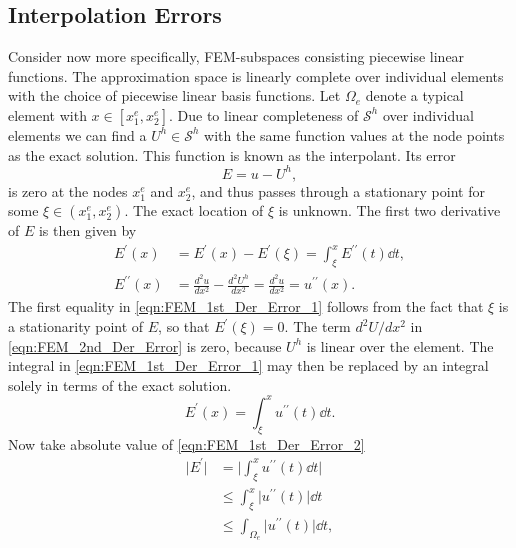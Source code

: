 \subsection{Interpolation Errors}	\label{cha:Interpolation_Errors}
Consider now more specifically, FEM-subspaces consisting piecewise linear functions. The approximation space is linearly complete
over individual elements with the choice of piecewise linear basis functions. Let $\Omega_e$ denote a typical element with
$x \in \left[ x_1^e, x_2^e \right]$. Due to linear completeness of $\mathcal{S}^h$ over individual elements we can find a
$U^h \in \mathcal{S}^h$ with the same function values at the node points as the exact solution. This function is known as the interpolant.
Its error
\begin{equation}	\label{eqn:FEM_Error_1}
	E = u - U^h,
\end{equation}
is zero at the nodes $x_1^e$ and $x_2^e$, and thus passes through a stationary point for some $\xi \in \left( x_1^e, x_2^e \right)$.
The exact location of $\xi$ is unknown. The first two derivative of $E$ is then given by
\begin{align}
	E^\prime \left( x \right) &= E^\prime \left( x \right) -
		E^\prime \left( \xi \right) = \int_{\xi}^x E^{\prime \prime} \left( t \right) \dd t,	\label{eqn:FEM_1st_Der_Error_1}	\\
	E^{ \prime \prime } \left( x \right) &= \frac{ d^2 u }{ dx^2 } - \frac{ d^2 U^h }{ dx^2 } = \frac{ d^2 u }{ dx^2 } =
		u^{ \prime \prime }	 \left( x \right)	\label{eqn:FEM_2nd_Der_Error}.
\end{align}
The first equality in \cref{eqn:FEM_1st_Der_Error_1} follows from the fact that $\xi$ is a stationarity point of $E$,
so that $E^\prime \left( \xi \right) = 0$. The term $d^2 U / dx^2$ in \cref{eqn:FEM_2nd_Der_Error}
is zero, because $U^h$ is linear over the element. The integral in \cref{eqn:FEM_1st_Der_Error_1} may then be replaced by an
integral solely in terms of the exact solution.
\begin{equation}	\label{eqn:FEM_1st_Der_Error_2}
	E^\prime \left( x \right) = \int_{\xi}^x u^{\prime \prime} \left( t \right) \dd t.
\end{equation}
Now take absolute value of \cref{eqn:FEM_1st_Der_Error_2}
\begin{equation}
	\begin{aligned}
		\big \vert E^\prime \big \vert &= \Big \vert \int_{\xi}^x u^{ \prime \prime } \left( t \right) \dd t \Big \vert	\\
		&\leq \int_{\xi}^x \Big \vert u^{ \prime \prime } \left( t \right) \Big \vert \dd t \\
		&\leq \int_{\Omega_e} \Big \vert u^{ \prime \prime } \left( t \right) \Big \vert \dd t,
	\end{aligned}
\end{equation}
